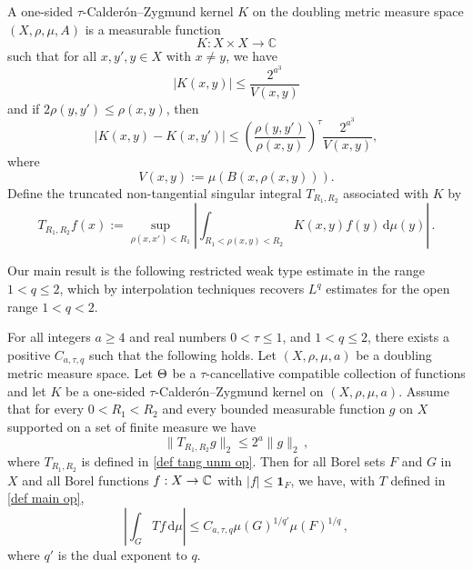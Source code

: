 A one-sided $\tau$-Calder\'on--Zygmund kernel $K$ on  the doubling metric measure space $(X, \rho, \mu, A)$ is a measurable function
 \begin{equation}\label{eqkernel0}
K:X\times X\to \mathbb{C}
 \end{equation}
such that for all $x,y',y\in X$ with $x\neq y$, we have
\begin{equation}\label{eqkernel size}
    |K(x,y)| \leq \frac{2^{a^3}}{V(x,y)}
  \end{equation}
 and if $2\rho(y,y') \leq \rho(x,y)$, then
  \begin{equation}
  \label{eqkernel y smooth}
       |K(x,y) - K(x,y')| \leq \left(\frac{\rho(y,y')}{\rho(x,y)}\right)^{\tau}\frac{2^{a^3}}{V(x,y)},
\end{equation}
where  \[V(x,y):=\mu(B(x,\rho(x,y))).\]
Define the  truncated non-tangential singular integral $T_{R_1,R_2}$ associated with $K$ by
\begin{equation}
    \label{def tang unm op}
    T_{R_1,R_2}f(x):=\sup_{\rho(x,x')<R_1} \left|\int_{R_1< \rho(x,y) < R_2}  K(x,y) f(y)  \, \mathrm{d}\mu(y) \right|\,.
\end{equation}

Our main result  is the following restricted weak type estimate in the range $1<q\le 2$, which by interpolation techniques recovers $L^q$ estimates for the open range
$1<q<2$.
\begin{theorem}
\label{thm main 1}
    For all  integers $a \ge  4$ and real numbers
    $0 < \tau\leq 1$,  and  $1<q\le 2$,
    there exists a positive $C_{a,\tau, q}$ such that the following holds.
    Let $(X,\rho,\mu,a)$ be a doubling metric measure space. Let  $\Theta$ be a
    $\tau$-cancellative compatible  collection of functions and let $K$ be a one-sided $\tau$-Calder\'on--Zygmund kernel on $(X,\rho,\mu,a)$. Assume  that for every $0<R_1<R_2$
    and every bounded measurable function $g$ on $X$ supported on a set of finite measure we have
    \begin{equation}\label{nontanbound}
        \|T_{R_1,R_2}g\|_{2} \leq 2^a \|g\|_2\,,
    \end{equation}
    where $T_{R_1,R_2}$ is defined in
\eqref{def tang unm op}.
    Then for all Borel sets $F$ and $G$ in $X$ and
    all Borel functions $f:X\to \mathbb{C}$ with
    $|f|\le \mathbf{1}_F$, we have, with $T$ defined in  \eqref{def main op},
    \begin{equation}
    \label{resweak}
        \left|\int_{G} T f \, \mathrm{d}\mu\right| \leq C_{a,\tau, q} \mu(G)^{1/q'} \mu(F)^{1/q}\,,
        \end{equation}
where $q'$ is the dual exponent to $q$.
\end{theorem}


